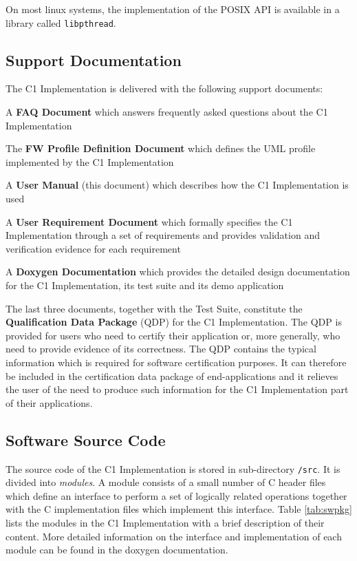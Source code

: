 \documentclass[a4paper,10pt]{article}
\newenvironment{fw_itemize}						%
{\begin{itemize}
  \setlength{\itemsep}{1mm}
  \setlength{\parskip}{0pt}
  \setlength{\parsep}{0pt}}
{\end{itemize}}
\begin{document}
On most linux systems, the implementation of the POSIX API is available in a library called \texttt{libpthread}. 

\subsection{Support Documentation}\label{sec:supportDoc}
The C1 Implementation is delivered with the following support documents: 

\begin{fw_itemize}
\item A \textbf{FAQ Document} which answers frequently asked questions about the C1 Implementation
\item The \textbf{FW Profile Definition Document} which defines the UML profile implemented by the C1 Implementation
\item A \textbf{User Manual} (this document) which describes how the C1 Implementation is used
\item A \textbf{User Requirement Document} which formally specifies the C1 Implementation
through a set of requirements and provides validation and verification evidence for each requirement
\item A \textbf{Doxygen Documentation} which provides the detailed design documentation for the C1 Implementation, its test suite and its demo application
\end{fw_itemize}

The last three documents, together with the Test Suite, constitute the \textbf{Qualification Data Package} (QDP) for the C1 Implementation. The QDP is provided for users who need to certify their application or, more generally, who need to provide evidence of its correctness. The QDP contains the typical information which is required for software certification purposes. It can therefore be included in the certification data package of end-applications and it relieves the user of the need to produce such information for the C1 Implementation part of their applications.

\subsection{Software Source Code}\label{sec:sourceCode}
The source code of the C1 Implementation is stored in sub-directory \texttt{/src}. It is divided into \emph{modules}. A module consists of a small number of C header files which define an interface to perform a set of logically related operations together with the C implementation files which implement this interface. Table \ref{tab:swpkg} lists the modules in the C1 Implementation with a brief description of their content. More detailed information on the interface and implementation of each module can be found in the doxygen documentation.
\end{document}
